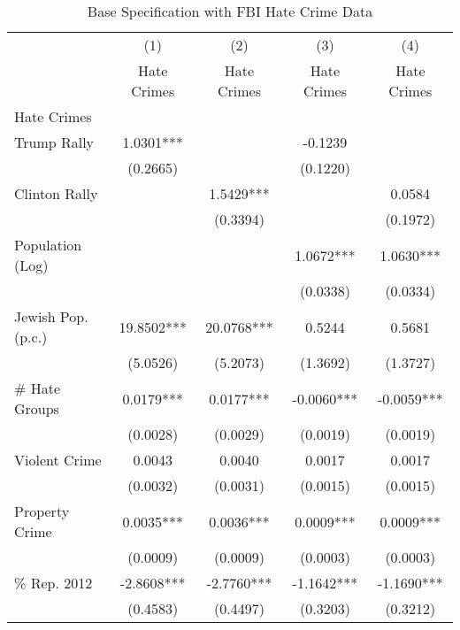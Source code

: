 \begin{table}[htbp]\centering
\def\sym#1{\ifmmode^{#1}\else\(^{#1}\)\fi}
\caption{Base Specification with FBI Hate Crime Data}
\begin{tabular}{l*{4}{c}}
\hline\hline
                    &\multicolumn{1}{c}{(1)}   &\multicolumn{1}{c}{(2)}   &\multicolumn{1}{c}{(3)}   &\multicolumn{1}{c}{(4)}   \\
                    & Hate Crimes   & Hate Crimes   & Hate Crimes   & Hate Crimes   \\
\hline
Hate Crimes         &               &               &               &               \\
Trump Rally         &      1.0301***&               &     -0.1239   &               \\
                    &    (0.2665)   &               &    (0.1220)   &               \\
Clinton Rally       &               &      1.5429***&               &      0.0584   \\
                    &               &    (0.3394)   &               &    (0.1972)   \\
Population (Log)    &               &               &      1.0672***&      1.0630***\\
                    &               &               &    (0.0338)   &    (0.0334)   \\
Jewish Pop. (p.c.)  &     19.8502***&     20.0768***&      0.5244   &      0.5681   \\
                    &    (5.0526)   &    (5.2073)   &    (1.3692)   &    (1.3727)   \\
# Hate Groups       &      0.0179***&      0.0177***&     -0.0060***&     -0.0059***\\
                    &    (0.0028)   &    (0.0029)   &    (0.0019)   &    (0.0019)   \\
Violent Crime       &      0.0043   &      0.0040   &      0.0017   &      0.0017   \\
                    &    (0.0032)   &    (0.0031)   &    (0.0015)   &    (0.0015)   \\
Property Crime      &      0.0035***&      0.0036***&      0.0009***&      0.0009***\\
                    &    (0.0009)   &    (0.0009)   &    (0.0003)   &    (0.0003)   \\
\% Rep. 2012        &     -2.8608***&     -2.7760***&     -1.1642***&     -1.1690***\\
                    &    (0.4583)   &    (0.4497)   &    (0.3203)   &    (0.3212)   \\

\end{tabular}
\end{table}
